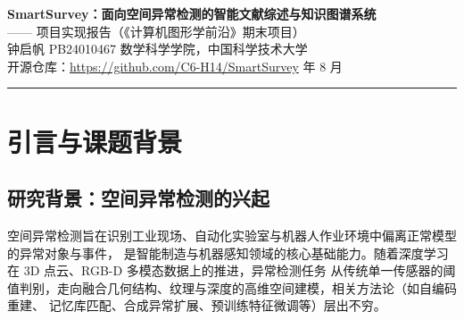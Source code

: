 \documentclass[a4paper,11pt]{article}
\begin{document}
\begin{center}
  {\LARGE\bfseries SmartSurvey：面向空间异常检测的智能文献综述与知识图谱系统}\\[0.3em]
  {\large —— 项目实现报告（《计算机图形学前沿》期末项目）}\\[0.5em]
  {\large 钟启帆 \quad PB24010467 \quad 数学科学学院，中国科学技术大学}\\[0.5em]
  {\large 开源仓库：\url{https://github.com/C6-H14/SmartSurvey}  年 8 月}
\end{center}

\vspace{0.3em}
\noindent\rule{\textwidth}{0.6pt}

\begin{abstract}
\noindent
面向工业与机器人场景的空间异常检测研究近年来呈爆发式增长，研究者人工梳理与对比成本急剧上升。
本文实现了一个面向空间异常检测与图形可视化的智能文献综述系统 SmartSurvey，以一组异构 3D/RGB-D
空间异常检测论文的 PDF 为输入，自动完成文献解析、空间视觉矩阵提取、证据约束审查与
中文 XeLaTeX 学术综述全文的动态排版生成。系统在架构上采用分层模块设计：以``核心章节识别 + 兜底页码切片''
混合解析保证鲁棒性，以``通用字段 + 领域字段''双层矩阵 Schema 组织对比指标，
以基于 \texttt{evidence\_quote in page\_text} 的 Inline Scope Binding 零丢纸事实校验拦截幻觉，
并以双层模板 XeLaTeX 物理排版引擎（含轻量语法栈扫描器与自愈重试）直接产出可贴入 Overleaf 的手稿。
在图形可视化层面，系统基于 PyVis 构建交互图形拓扑网络，将文献间主题关联直观呈现。
系统同时实现 OS Keyring → .env → 会话内存三级凭据降级与网关指数退避重试，保障公网与无头容器场景安全运行。
经 126 项自动化单元测试全量验证（100\% PASS）并开源交付。

\noindent\textbf{关键词：} 空间异常检测；3D/RGB-D 视觉；智能文献综述；PyVis 图形拓扑网络；XeLaTeX 动态排版；零丢纸事实校验
\end{abstract}

\section{引言与课题背景}

\subsection{研究背景：空间异常检测的兴起}
空间异常检测旨在识别工业现场、自动化实验室与机器人作业环境中偏离正常模型的异常对象与事件，
是智能制造与机器感知领域的核心基础能力。随着深度学习在 3D 点云、RGB-D 多模态数据上的推进，异常检测任务
从传统单一传感器的阈值判别，走向融合几何结构、纹理与深度的高维空间建模，相关方法论（如自编码重建、
记忆库匹配、合成异常扩展、预训练特征微调等）层出不穷。
\end{document}

